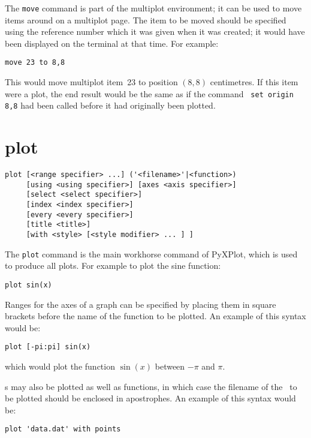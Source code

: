 The {\tt move} command is part of the multiplot environment; it can be used to
move items around on a multiplot page. The item to be moved should be specified
using the reference number which it was given when it was created; it would
have been displayed on the terminal at that time. For example:

\begin{verbatim}
move 23 to 8,8
\end{verbatim}

\noindent This would move multiplot item~23 to position $(8,8)$ centimetres. If
this item were a plot, the end result would be the same as if the command {\tt
set origin 8,8} had been called before it had originally been plotted.


\section{plot}

\begin{verbatim}
plot [<range specifier> ...] ('<filename>'|<function>)
     [using <using specifier>] [axes <axis specifier>]
     [select <select specifier>]
     [index <index specifier>]
     [every <every specifier>]
     [title <title>]
     [with <style> [<style modifier> ... ] ]
\end{verbatim}

The {\tt plot} command is the main workhorse command of PyXPlot, which is used
to produce all plots. For example to plot the sine function:

\begin{verbatim}
plot sin(x)
\end{verbatim}

Ranges for the axes of a graph can be specified by placing them in
square brackets before the name of the function to be plotted. An example of
this syntax would be:

\begin{verbatim}
plot [-pi:pi] sin(x)
\end{verbatim}

\noindent which would plot the function $\sin(x)$ between $-\pi$ and $\pi$.

\Datafile s may also be plotted as well as functions, in which case the filename
of the \datafile\ to be plotted should be enclosed in apostrophes. An example of
this syntax would be:

\begin{verbatim}
plot 'data.dat' with points
\end{verbatim}

